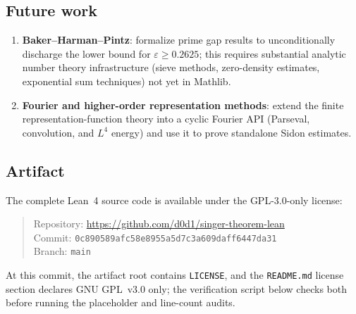 \documentclass[11pt,a4paper]{article}
\begin{document}
\subsection{Future work}
\label{sec:future}

\begin{enumerate}[nosep]
  \item \textbf{Baker--Harman--Pintz}: formalize prime gap results to
    unconditionally discharge the lower bound for $\varepsilon \ge 0.2625$;
    this requires substantial analytic number theory infrastructure
    (sieve methods, zero-density estimates, exponential sum techniques)
    not yet in Mathlib.
  \item \textbf{Fourier and higher-order representation methods}: extend the
    finite representation-function theory into a cyclic Fourier API
    (Parseval, convolution, and $L^4$ energy) and use it to prove standalone
    Sidon estimates.
\end{enumerate}

\subsection*{Artifact}

The complete Lean~4 source code is available under the GPL-3.0-only license:
\begin{quote}\small
Repository: \url{https://github.com/d0d1/singer-theorem-lean}\\
Commit: \texttt{0c890589afc58e8955a5\allowbreak{}d7c3a609daff6447da31}\\
Branch: \texttt{main}
\end{quote}
At this commit, the artifact root contains \texttt{LICENSE}, and the
    \texttt{README.md} license section declares GNU GPL~v3.0 only; the verification
script below checks both before running the placeholder and line-count audits.
\end{document}

